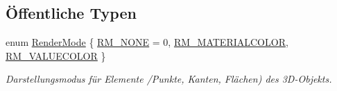 \subsection*{Öffentliche Typen}
\begin{DoxyCompactItemize}
\item 
enum \hyperlink{classRenderer_aa9844470f59e9fdf3aed088936100863}{Render\-Mode} \{ \hyperlink{classRenderer_aa9844470f59e9fdf3aed088936100863a117f4ca0fdddef6e71774540e331efe9}{R\-M\-\_\-\-N\-O\-N\-E} = 0, 
\hyperlink{classRenderer_aa9844470f59e9fdf3aed088936100863a5b763e13120b7189e59806712789556b}{R\-M\-\_\-\-M\-A\-T\-E\-R\-I\-A\-L\-C\-O\-L\-O\-R}, 
\hyperlink{classRenderer_aa9844470f59e9fdf3aed088936100863aff17440f3de9508b77d4762742c00c07}{R\-M\-\_\-\-V\-A\-L\-U\-E\-C\-O\-L\-O\-R}
 \}
\begin{DoxyCompactList}\small\item\em Darstellungsmodus für Elemente /\-Punkte, Kanten, Flächen) des 3\-D-\/\-Objekts. \end{DoxyCompactList}\end{DoxyCompactItemize}
